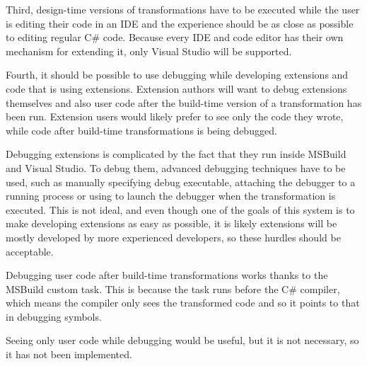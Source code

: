 Third, design-time versions of transformations have to be executed while the user is editing their code in an \ac{IDE} and the experience should be as close as possible to editing regular C\# code. Because every \ac{IDE} and code editor has their own mechanism for extending it, only Visual Studio will be supported.

\label{debugging}
Fourth, it should be possible to use debugging while developing extensions and code that is using extensions. Extension authors will want to debug extensions themselves and also user code after the build-time version of a transformation has been run. Extension users would likely prefer to see only the code they wrote, while code after build-time transformations is being debugged.

Debugging extensions is complicated by the fact that they run inside MSBuild and Visual Studio. To debug them, advanced debugging techniques have to be used, such as manually specifying debug executable, attaching the debugger to a running process or using  \cite{debugger-break} to launch the debugger when the transformation is executed. This is not ideal, and even though one of the goals of this system is to make developing extensions as easy as possible, it is likely extensions will be mostly developed by more experienced developers, so these hurdles should be acceptable.

Debugging user code after build-time transformations works thanks to the MSBuild custom task. This is because the task runs before the C\# compiler, which means the compiler only sees the transformed code and so it points to that in debugging symbols.

Seeing only user code while debugging would be useful, but it is not necessary, so it has not been implemented.

\bigskip

